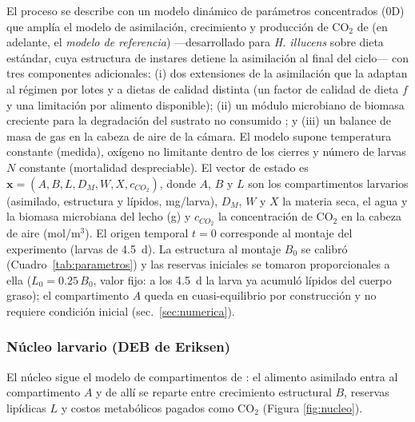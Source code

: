 El proceso se describe con un modelo dinámico de parámetros concentrados (0D) que amplía el modelo de asimilación, crecimiento y producción de CO$_2$ de \textcite{eriksenDynamicModellingFeed2022,eriksenMetabolicPerformanceFeed2024} (en adelante, el \emph{modelo de referencia}) ---desarrollado para \textit{H. illucens} sobre dieta estándar, cuya estructura de instares detiene la asimilación al final del ciclo--- con tres componentes adicionales: (i) dos extensiones de la asimilación que la adaptan al régimen por lotes y a dietas de calidad distinta (un factor de calidad de dieta $f$ y una limitación por alimento disponible); (ii) un módulo microbiano de biomasa creciente para la degradación del sustrato no consumido \parencite{roels1980}; y (iii) un balance de masa de gas en la cabeza de aire de la cámara. El modelo supone temperatura constante (medida), oxígeno no limitante dentro de los cierres y número de larvas $N$ constante (mortalidad despreciable). El vector de estado es $\mathbf{x} = (A, B, L, D_M, W, X, c_{CO_2})$, donde $A$, $B$ y $L$ son los compartimentos larvarios (asimilado, estructura y lípidos, mg/larva), $D_M$, $W$ y $X$ la materia seca, el agua y la biomasa microbiana del lecho (g) y $c_{CO_2}$ la concentración de CO$_2$ en la cabeza de aire (mol/m$^3$). El origen temporal $t = 0$ corresponde al montaje del experimento (larvas de 4.5~d). La estructura al montaje $B_0$ se calibró (Cuadro~\ref{tab:parametros}) y las reservas iniciales se tomaron proporcionales a ella ($L_0 = 0.25\,B_0$, valor fijo: a los 4.5~d la larva ya acumuló lípidos del cuerpo graso); el compartimento $A$ queda en cuasi-equilibrio por construcción y no requiere condición inicial (sec.~\ref{sec:numerica}).


\subsubsection{Núcleo larvario (DEB de Eriksen)}

El núcleo sigue el modelo de compartimentos de \textcite{eriksenDynamicModellingFeed2022}: el alimento asimilado entra al compartimento $A$ y de allí se reparte entre crecimiento estructural $B$, reservas lipídicas $L$ y costos metabólicos pagados como CO$_2$ (Figura \ref{fig:nucleo}).

